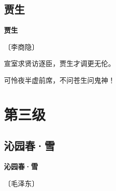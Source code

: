\documentclass[12pt,UTF-8,openany,fontset=none]{ctexbook}
\begin{document}
\vspace{8pt}
\clearpage

\section{贾生}


\begin{center}
    {\bfseries 贾生}

    \vspace{18pt}

    \begin{large}\xuwen
        〔李商隐〕
    \end{large}

\end{center}

    \vspace{18pt}

\begin{center}
    \begin{Large}

        宣室求贤访逐臣，贾生才调更无伦。

        可怜夜半虚前席，不问苍生问鬼神！

    \end{Large}

\end{center}

\vspace{8pt}
\clearpage

\chapter{第三级}
\clearpage

\section{沁园春·雪}


\begin{center}
    {\bfseries 沁园春·雪}

    \vspace{18pt}

    \begin{large}\xuwen
        〔毛泽东〕
    \end{large}

\end{center}
\end{document}
